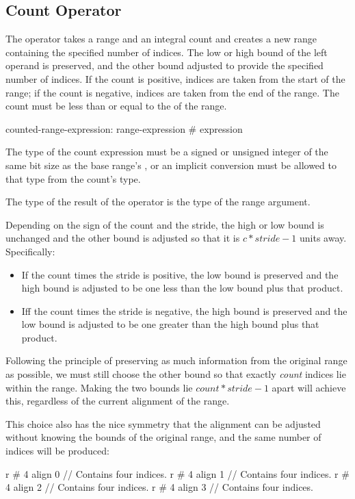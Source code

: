 \subsection{Count Operator}
\label{Count_Operator}

The \chpl{#} operator takes a range and an integral count and creates a new
range containing the specified number of indices.  The low or high bound of the
left operand is preserved, and the other bound adjusted to provide the specified
number of indices.  If the count is positive, indices are taken from the start
of the range; if the count is negative, indices are taken from the end of the
range.  The count must be less than or equal to the  of the range.

\begin{syntax}
counted-range-expression:
  range-expression # expression
\end{syntax}

The type of the count expression must be a signed or unsigned integer
of the same bit size as the base range's , or an
implicit conversion must be allowed to that type from the count's
type.

The type of the result of the \chpl{#} operator is the type of the
range argument.

Depending on the sign of the count and the stride, the high or low bound is
unchanged and the other bound is adjusted so that it is $c * stride - 1$ units
away.  Specifically:
\begin{itemize}
\item If the count times the stride is positive, the low bound is preserved
and the high bound is adjusted to be one less than the low bound plus that
product.
\item Iff the count times the stride is negative, the high bound is preserved
and the low bound is adjusted to be one greater than the high bound plus that
product.
\end{itemize}

\begin{rationale}
Following the principle of preserving as much information from the original
range as possible, we must still choose the other bound so that
exactly \emph{count} indices lie within the range.  Making the two bounds lie
$count * stride - 1$ apart will achieve this, regardless of the current
alignment of the range.

This choice also has the nice symmetry that the alignment can be adjusted
without knowing the bounds of the original range, and the same number of indices
will be produced:
\begin{chapel}
r # 4 align 0   // Contains four indices.
r # 4 align 1   // Contains four indices.
r # 4 align 2   // Contains four indices.
r # 4 align 3   // Contains four indices.
\end{chapel}
\end{rationale}

